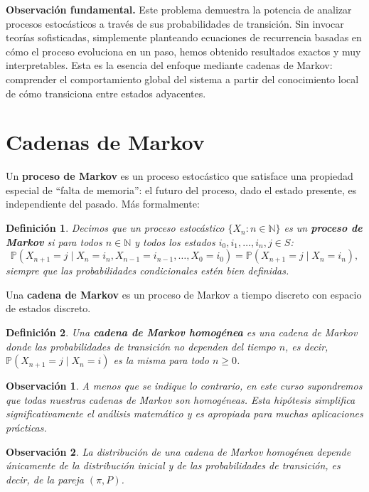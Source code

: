 \documentclass[12pt]{book}
\newtheorem{definition}{Definición}[chapter]
\newtheorem{remark}{Observación}[chapter]
\begin{document}
\textbf{Observación fundamental.} Este problema demuestra la potencia de analizar procesos estocásticos a través de sus probabilidades de transición. Sin invocar teorías sofisticadas, simplemente planteando ecuaciones de recurrencia basadas en cómo el proceso evoluciona en un paso, hemos obtenido resultados exactos y muy interpretables. Esta es la esencia del enfoque mediante cadenas de Markov: comprender el comportamiento global del sistema a partir del conocimiento local de cómo transiciona entre estados adyacentes.

\section{Cadenas de Markov}

Un \textbf{proceso de Markov} es un proceso estocástico que satisface una propiedad especial de ``falta de memoria'': el futuro del proceso, dado el estado presente, es independiente del pasado. Más formalmente:

\begin{definition}
Decimos que un proceso estocástico $\{X_n : n \in \mathbb{N}\}$ es un \textbf{proceso de Markov} si para todos $n \in \mathbb{N}$ y todos los estados $i_0, i_1, \ldots, i_n, j \in S$:
\[
\mathbb{P}(X_{n+1} = j \mid X_n = i_n, X_{n-1} = i_{n-1}, \ldots, X_0 = i_0) = \mathbb{P}(X_{n+1} = j \mid X_n = i_n),
\]
siempre que las probabilidades condicionales estén bien definidas.
\end{definition}

Una \textbf{cadena de Markov} es un proceso de Markov a tiempo discreto con espacio de estados discreto.

\begin{definition}
Una \textbf{cadena de Markov homogénea} es una cadena de Markov donde las probabilidades de transición no dependen del tiempo $n$, es decir, $\mathbb{P}(X_{n+1} = j \mid X_n = i)$ es la misma para todo $n \geq 0$.
\end{definition}

\begin{remark}
A menos que se indique lo contrario, en este curso supondremos que todas nuestras cadenas de Markov son homogéneas. Esta hipótesis simplifica significativamente el análisis matemático y es apropiada para muchas aplicaciones prácticas.
\end{remark}

\begin{remark}
    La distribución de una cadena de Markov homogénea depende únicamente de la distribución inicial y de las probabilidades de transición, es decir, de la pareja $(\pi,P)$.
\end{remark}
\end{document}
